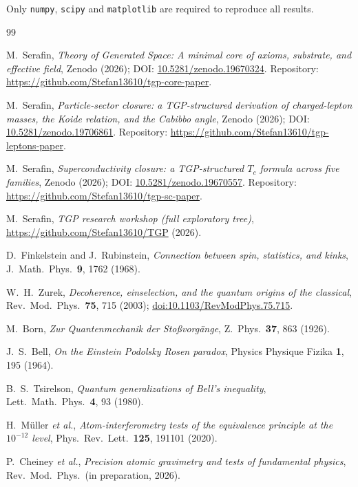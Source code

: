 \documentclass[11pt,a4paper]{article}
\begin{document}
Only \texttt{numpy}, \texttt{scipy} and \texttt{matplotlib} are
required to reproduce all results.

\begin{thebibliography}{99}

M.~Serafin,
\emph{Theory of Generated Space: A minimal core of axioms,
substrate, and effective field},
Zenodo (2026); DOI:
\href{https://doi.org/10.5281/zenodo.19670324}{10.5281/zenodo.19670324}.
Repository: \url{https://github.com/Stefan13610/tgp-core-paper}.

M.~Serafin,
\emph{Particle-sector closure: a TGP-structured derivation of
charged-lepton masses, the Koide relation, and the Cabibbo angle},
Zenodo (2026); DOI:
\href{https://doi.org/10.5281/zenodo.19706861}{10.5281/zenodo.19706861}.
Repository: \url{https://github.com/Stefan13610/tgp-leptons-paper}.

M.~Serafin,
\emph{Superconductivity closure: a TGP-structured $T_{c}$ formula
across five families},
Zenodo (2026); DOI:
\href{https://doi.org/10.5281/zenodo.19670557}{10.5281/zenodo.19670557}.
Repository: \url{https://github.com/Stefan13610/tgp-sc-paper}.

M.~Serafin,
\emph{TGP research workshop (full exploratory tree)},
\url{https://github.com/Stefan13610/TGP} (2026).

D.~Finkelstein and J.~Rubinstein,
\emph{Connection between spin, statistics, and kinks},
J.\ Math.\ Phys.\ \textbf{9}, 1762 (1968).

W.~H.~Zurek,
\emph{Decoherence, einselection, and the quantum origins of the
classical},
Rev.\ Mod.\ Phys.\ \textbf{75}, 715 (2003);
\href{https://doi.org/10.1103/RevModPhys.75.715}{doi:10.1103/RevModPhys.75.715}.

M.~Born,
\emph{Zur Quantenmechanik der Sto\ss vorg\"ange},
Z.\ Phys.\ \textbf{37}, 863 (1926).

J.~S.~Bell,
\emph{On the Einstein Podolsky Rosen paradox},
Physics Physique Fizika \textbf{1}, 195 (1964).

B.~S.~Tsirelson,
\emph{Quantum generalizations of Bell's inequality},
Lett.\ Math.\ Phys.\ \textbf{4}, 93 (1980).

H.~M\"uller \emph{et al.},
\emph{Atom-interferometry tests of the equivalence principle at the
$10^{-12}$ level},
Phys.\ Rev.\ Lett.\ \textbf{125}, 191101 (2020).

P.~Cheiney \emph{et al.},
\emph{Precision atomic gravimetry and tests of fundamental physics},
Rev.\ Mod.\ Phys.\ (in preparation, 2026).

\end{thebibliography}
\end{document}
